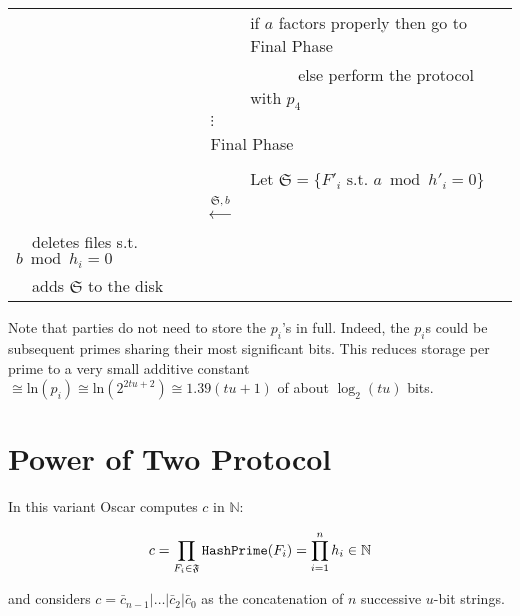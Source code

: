 \documentclass[11pt]{llncs}
\begin{document}
\begin{center}
\begin{tabular}{lcl}
                                   &                                                      &if $a$ factors properly then go to {\sf Final Phase}\\
                                   &                                                      &~~~~~~else perform the protocol with $p_4$ ~~\\
                                   &                  $\vdots$
& \\\midrule
\multicolumn{3}{c}{{\sf Final Phase~~}} \\\midrule
                                   &                                                      & \\
                                   &                                                      &Let $\mathfrak{S}=\{F'_i \mbox{~s.t.~} a \bmod h'_i =0\}$~~\\
                                   &~~{\LARGE $\stackrel{\mathfrak{S},b}{\longleftarrow}$}&\\
                                   ~~deletes files s.t. $b \bmod h_i =0$&                                                      &\\
                                   ~~adds $\mathfrak{S}$ to the disk
                                   &
                                   &\\\bottomrule
\end{tabular}
\end{center}

Note that parties do not need to store the $p_i$'s in full. Indeed, the $p_i$s could be subsequent primes sharing their most significant bits. This reduces storage per prime to a very small additive constant $ \cong \mbox{ln}(p_i) \cong \mbox{ln}(2^{2tu+2}) \cong 1.39(tu+1)$ of about $\log_2(tu)$ bits.

\section{Power of Two Protocol}
\label{powtwo}

In this variant Oscar computes $c$ in $\mathbb{N}$:

$$
c=\prod_{F_i\in \mathfrak{F}} \mbox{{\tt HashPrime}}(F_i) = \prod_{i=1}^n h_i \in \mathbb{N}
$$

and considers $c=\bar{c}_{n-1}|\ldots|\bar{c}_2|\bar{c}_0$ as the concatenation of $n$ successive $u$-bit strings.
\end{document}

